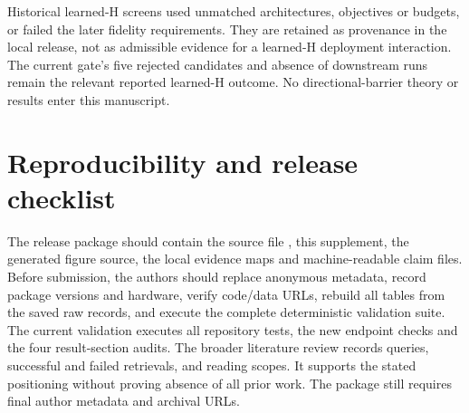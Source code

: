 \documentclass[11pt]{article}
\newcommand{\code}[1]{\texttt{\detokenize{#1}}}
\begin{document}
Historical learned-H screens used unmatched architectures, objectives
or budgets, or failed the later fidelity requirements. They are retained
as provenance in the local release, not as admissible evidence for a
learned-H deployment interaction. The current gate's five rejected
candidates and absence of downstream runs remain the relevant reported
learned-H outcome. No directional-barrier theory or results enter this
manuscript.

\section{Reproducibility and release checklist}

The release package should contain the source file
\code{paper_g2_jcp_new.tex}, this supplement, the generated figure source,
the local evidence maps and machine-readable claim files. Before
submission, the authors should replace anonymous metadata, record package
versions and hardware, verify code/data URLs, rebuild all tables from the
saved raw records, and execute the complete deterministic validation suite.
The current validation executes all repository tests, the new endpoint
checks and the four result-section audits. The broader literature review
records queries, successful and failed retrievals, and reading scopes.
It supports the stated positioning without proving absence of all prior
work. The package still requires final author metadata and archival URLs.
\end{document}
